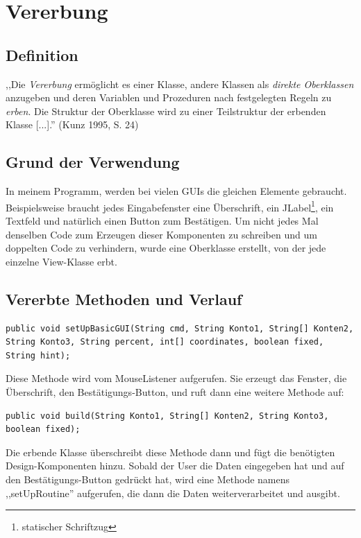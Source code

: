 \documentclass[12pt]{report}
\begin{document}
\section{Vererbung} 
  
\subsection{Definition}
,,Die \textit{Vererbung} ermöglicht es einer Klasse, andere Klassen als  \textit{direkte Oberklassen} anzugeben und deren Variablen und Prozeduren nach festgelegten Regeln zu  \textit{erben}. Die Struktur der Oberklasse wird zu einer Teilstruktur der erbenden Klasse [...].'' (Kunz 1995,  S. 24\nocite{Vererbung})
\subsection{Grund der Verwendung}
In meinem Programm, werden bei vielen GUIs die gleichen Elemente gebraucht. Beispielsweise braucht jedes Eingabefenster eine Überschrift, ein JLabel\footnote{statischer Schriftzug}, ein Textfeld und natürlich einen Button zum Bestätigen. Um nicht jedes Mal denselben Code zum Erzeugen dieser Komponenten zu schreiben und um doppelten Code zu verhindern, wurde eine Oberklasse erstellt, von der jede einzelne View-Klasse erbt. 

\subsection{Vererbte Methoden und Verlauf}

\lstset{language=Java, breaklines=true}
\begin{lstlisting}
public void setUpBasicGUI(String cmd, String Konto1, String[] Konten2, String Konto3, String percent, int[] coordinates, boolean fixed, String hint);
\end{lstlisting}
Diese Methode wird vom MouseListener aufgerufen. Sie erzeugt das Fenster, die Überschrift, den Bestätigungs-Button, und ruft dann eine weitere Methode auf:
\begin{lstlisting}
public void build(String Konto1, String[] Konten2, String Konto3, boolean fixed);
\end{lstlisting}
Die erbende Klasse überschreibt diese Methode dann und fügt die benötigten Design-Komponenten hinzu. Sobald der User die Daten eingegeben hat und auf den Bestätigungs-Button gedrückt hat, wird eine Methode namens ,,setUpRoutine'' aufgerufen, die dann die Daten weiterverarbeitet und ausgibt.
\end{document}
